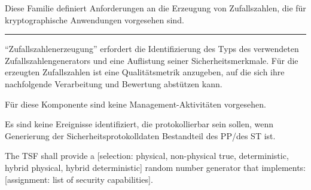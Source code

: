 


Diese Familie definiert Anforderungen an die Erzeugung von
Zufallszahlen, die für kryptographische Anwendungen vorgesehen sind.



\vspace{2ex}
%
\rule[.5ex]{2cm}{0.1pt}%
\par
\vspace{2ex}

 "`Zufallszahlenerzeugung"' erfordert die Identifizierung
des Typs des verwendeten Zufallszahlengenerators und eine Auflistung
seiner Sicherheitsmerkmale. Für die erzeugten Zufallszahlen ist eine
Qualitätsmetrik anzugeben, auf die sich ihre nachfolgende Verarbeitung
und Bewertung abstützen kann.



Für diese Komponente sind keine Management-Aktivitäten vorgesehen.


Es sind keine Ereignisse identifiziert, die protokollierbar sein
sollen, wenn  Generierung der Sicherheitsprotokolldaten
Bestandteil des PP/des ST ist.

\vspace{1ex}


\begin{sfrdefinitionlist}
\item[{\normalfont{\small\secitem{FCS_RNG.1.1}}}] The TSF shall provide a {[}selection:
  physical, non-physical true, deterministic, hybrid physical, hybrid
  deterministic] random number generator that implements:
  {[}assignment: list of security capabilities{]}.
\end{sfrdefinitionlist}

